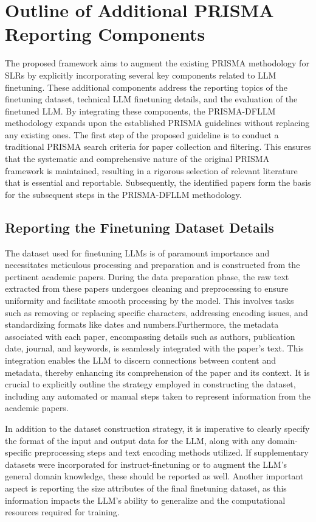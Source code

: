 \documentclass{article}
\begin{document}
\section{Outline of Additional PRISMA Reporting Components}


The proposed framework aims to augment the existing PRISMA methodology for SLRs by explicitly incorporating several key components related to LLM finetuning. These additional components address the reporting topics of the finetuning dataset, technical LLM finetuning details, and the evaluation of the finetuned LLM. By integrating these components, the PRISMA-DFLLM methodology expands upon the established PRISMA guidelines without replacing any existing ones. The first step of the proposed guideline is to conduct a traditional PRISMA search criteria for paper collection and filtering. This ensures that the systematic and comprehensive nature of the original PRISMA framework is maintained, resulting in a rigorous selection of relevant literature that is essential and reportable. Subsequently, the identified papers form the basis for the subsequent steps in the PRISMA-DFLLM methodology.


\subsection{Reporting the Finetuning Dataset Details}

The dataset used for finetuning LLMs is of paramount importance and necessitates meticulous processing and preparation and is constructed from the pertinent academic papers. During the data preparation phase, the raw text extracted from these papers undergoes cleaning and preprocessing to ensure uniformity and facilitate smooth processing by the model. This involves tasks such as removing or replacing specific characters, addressing encoding issues, and standardizing formats like dates and numbers.Furthermore, the metadata associated with each paper, encompassing details such as authors, publication date, journal, and keywords, is seamlessly integrated with the paper's text. This integration enables the LLM to discern connections between content and metadata, thereby enhancing its comprehension of the paper and its context. It is crucial to explicitly outline the strategy employed in constructing the dataset, including any automated or manual steps taken to represent information from the academic papers.

In addition to the dataset construction strategy, it is imperative to clearly specify the format of the input and output data for the LLM, along with any domain-specific preprocessing steps and text encoding methods utilized. If supplementary datasets were incorporated for instruct-finetuning or to augment the LLM's general domain knowledge, these should be reported as well. Another important aspect is reporting the size attributes of the final finetuning dataset, as this information impacts the LLM's ability to generalize and the computational resources required for training. 
\end{document}
